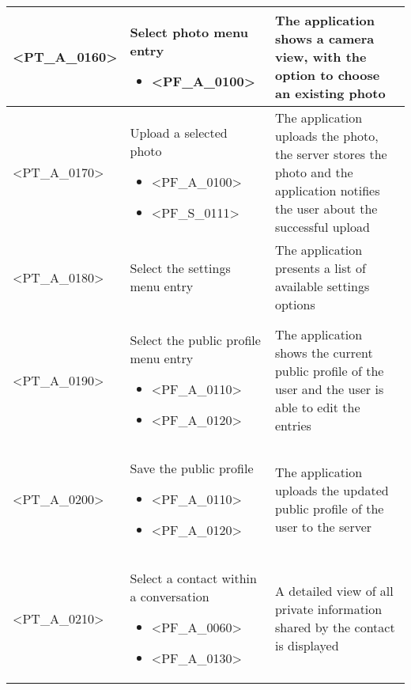 \begin{longtable} {| p{} | p{} | p{} |}
    <PT\_A\_0160> & 
    Select photo menu entry
        \begin{itemize}
            \item <PF\_A\_0100>
        \end{itemize} & 
    The application shows a camera view, with the option to choose an existing photo \\ \hline
    
    <PT\_A\_0170> & 
    Upload a selected photo
        \begin{itemize}
            \item <PF\_A\_0100>
            \item <PF\_S\_0111>
        \end{itemize} & 
    The application uploads the photo, the server stores the photo and the application notifies the user about the successful upload\\ \hline
    
    <PT\_A\_0180> & 
    Select the settings menu entry & 
    The application presents a list of available settings options \\ \hline
    
    <PT\_A\_0190> & 
    Select the public profile menu entry
        \begin{itemize}
            \item <PF\_A\_0110>
            \item <PF\_A\_0120>
        \end{itemize} & 
    The application shows the current public profile of the user and the user is able to edit the entries \\ \hline
    
    <PT\_A\_0200> & 
    Save the public profile
        \begin{itemize}
            \item <PF\_A\_0110>
            \item <PF\_A\_0120>
        \end{itemize} & 
    The application uploads the updated public profile of the user to the server \\ \hline
    
    <PT\_A\_0210> & 
    Select a contact within a conversation
        \begin{itemize}
            \item <PF\_A\_0060>
            \item <PF\_A\_0130>
        \end{itemize} & 
    A detailed view of all private information shared by the contact is displayed \\ \hline
    

\end{longtable}
